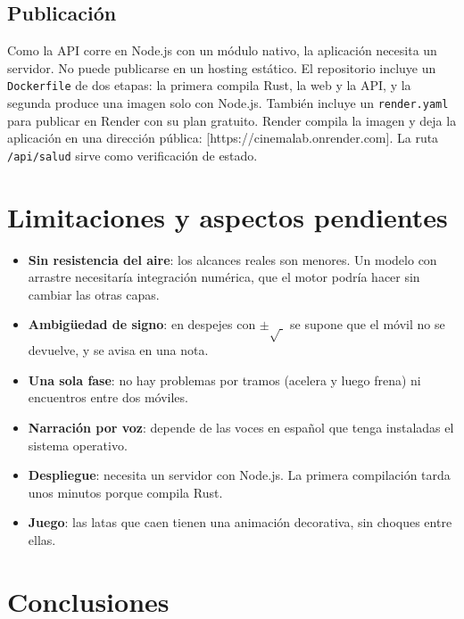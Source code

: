 \documentclass[11pt,letterpaper]{article}
\newcommand{\pend}[1]{\textcolor{orange!80!black}{[#1]}}
\begin{document}
\subsection{Publicación}

Como la API corre en Node.js con un módulo nativo, la aplicación necesita un servidor. No puede publicarse en un hosting estático. El repositorio incluye un \texttt{Dockerfile} de dos etapas: la primera compila Rust, la web y la API, y la segunda produce una imagen solo con Node.js. También incluye un \texttt{render.yaml} para publicar en Render con su plan gratuito. Render compila la imagen y deja la aplicación en una dirección pública: \pend{https://cinemalab.onrender.com}. La ruta \texttt{/api/salud} sirve como verificación de estado.

\section{Limitaciones y aspectos pendientes}

\begin{itemize}
  \item \textbf{Sin resistencia del aire}: los alcances reales son menores. Un modelo con arrastre necesitaría integración numérica, que el motor podría hacer sin cambiar las otras capas.
  \item \textbf{Ambigüedad de signo}: en despejes con $\pm\sqrt{\;}$ se supone que el móvil no se devuelve, y se avisa en una nota.
  \item \textbf{Una sola fase}: no hay problemas por tramos (acelera y luego frena) ni encuentros entre dos móviles.
  \item \textbf{Narración por voz}: depende de las voces en español que tenga instaladas el sistema operativo.
  \item \textbf{Despliegue}: necesita un servidor con Node.js. La primera compilación tarda unos minutos porque compila Rust.
  \item \textbf{Juego}: las latas que caen tienen una animación decorativa, sin choques entre ellas.
\end{itemize}

\section{Conclusiones}
\end{document}
